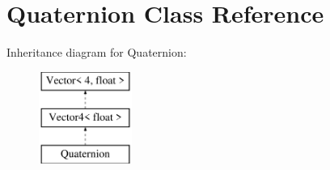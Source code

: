 \hypertarget{class_quaternion}{}\section{Quaternion Class Reference}
\label{class_quaternion}
Inheritance diagram for Quaternion\+:\begin{figure}[H]
\begin{center}
\leavevmode
\includegraphics[height=3.000000cm]{class_quaternion}
\end{center}
\end{figure}
